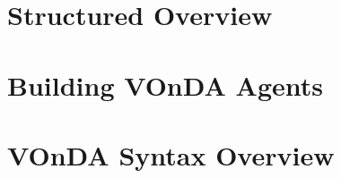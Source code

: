 \documentclass[a4paper]{report}
\newcommand{\vonda}{VOnDA\xspace}
\begin{document}
\chapter{Structured Overview}

\newpage

\newpage


\chapter{Building \vonda Agents}

\newpage
\chapter{\vonda Syntax Overview}




\end{document}
